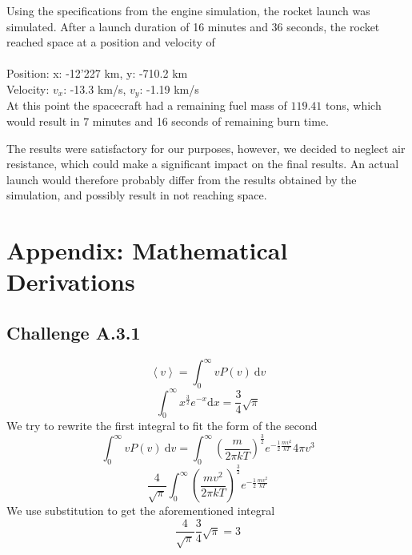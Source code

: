 \documentclass[reprint,english,notitlepage]{revtex4-2}
\begin{document}
Using the specifications from the engine simulation, the rocket launch was simulated.
After a launch duration of 16 minutes and 36 seconds, the rocket reached space at a position and velocity of\\\\
Position: x: -12'227 km, y: -710.2 km\\
Velocity: $v_x$: -13.3 km/s, $v_y$: -1.19 km/s\\

At this point the spacecraft had a remaining fuel mass of $119.41$ tons, which would result in 7 minutes and 16 seconds of remaining burn time.

The results were satisfactory for our purposes, however, we decided to neglect air resistance, which could make a significant impact on the final results.
An actual launch would therefore probably differ from the results obtained by the simulation, and possibly result in not reaching space.


\section{Appendix: Mathematical Derivations}
	\subsection*{Challenge A.3.1}
	\[
	\left< v \right> =  \int_{0}^{\infty} vP(v) \ \mathrm{d}v
	\]
	\[
	\int_{0}^{\infty} x^{\frac{3}{2}} e^{-x} \mathrm{d}x = \frac{3}{4} \sqrt{\pi}  
	\]
	We try to rewrite the first integral to fit the form of the second 
	\[
	\int _{0}^{\infty} vP(v) \ \mathrm{d}v = \int _{0}^{\infty} \left( \frac{m}{2 \pi k T} \right) ^{\frac{3}{2}} e ^{-\frac{1}{2} \frac{mv^{2}}{k T}} 4 \pi v^{3}
	\]\newline 
	\[
	\frac{4}{\sqrt{\pi}} \int _{0}^{\infty} \left( \frac{mv^{2}}{2 \pi k T} \right) ^{\frac{3}{2}} e ^{-\frac{1}{2} \frac{mv^{2}}{k T}} 
	\]
	We use substitution to get the aforementioned integral
	\[
	\frac{4}{\sqrt{\pi}} \frac{3}{4} \sqrt{\pi} = 3
	\]
\end{document}
